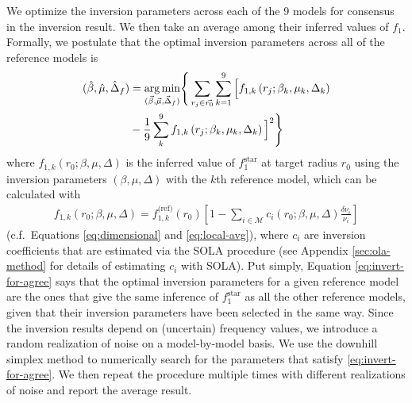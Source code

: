 \documentclass[twocolumn,twocolappendix]{aastex6}
\begin{document}
We optimize the inversion parameters across each of the 9 models for consensus in the inversion result. We then take an average among their inferred values of $f_1$. %
Formally, we postulate that the optimal inversion parameters across all of the reference models is 
\begin{align} \label{eq:invert-for-agree}
    (\hat \beta, \hat \mu, \hat \Delta_f)
    &=
    \underset{(\vec \beta, \vec \mu, \vec \Delta_f)}{\arg\min} \Bigg\{ 
    \sum_{r_j\in \vec{r_0}} 
        \sum_{k=1}^{9} 
            \Big[ f_{1,k}\left(r_j; \beta_k, \mu_k, \Delta_k\right) 
\notag\\& - \frac{1}{9}\sum_k^9 f_{1,k}\left(r_j; \beta_k, \mu_k, \Delta_k\right) \Big]^2
    \Bigg\}
\end{align}
where $f_{1,k}(r_0; \beta, \mu, \Delta)$ is the inferred value of $f_1^{\text{star}}$ at target radius $r_0$ using the inversion parameters $(\beta, \mu, \Delta)$ with the $k$th reference model, which can be calculated with
\begin{align}
    f_{1,k}(r_0; \beta, \mu, \Delta) 
    = 
    f_{1,k}^{\text{(ref)}}(r_0) \left[ 1 - \sum_{i \in \mathscr{M}} c_i(r_0; \beta, \mu, \Delta) \frac{\delta\nu_i}{\nu_i} \right]
\end{align}
(c.f.~Equations \ref{eq:dimensional} and \ref{eq:local-avg}), where $c_i$ are inversion coefficients that are estimated via the SOLA procedure (see Appendix \ref{sec:ola-method} for details of estimating $c_i$ with SOLA). 
Put simply, Equation \ref{eq:invert-for-agree} says that the optimal inversion parameters for a given reference model are the ones that give the same inference of $f_1^{\text{star}}$ as all the other reference models, given that their inversion parameters have been selected in the same way. Since the inversion results depend on (uncertain) frequency values, we introduce a random realization of noise on a model-by-model basis. We use the \citet{nelder1965simplex} downhill simplex method to numerically search for the parameters that satisfy \ref{eq:invert-for-agree}. We then repeat the procedure multiple times with different realizations of noise and report the average result. 
\end{document}

